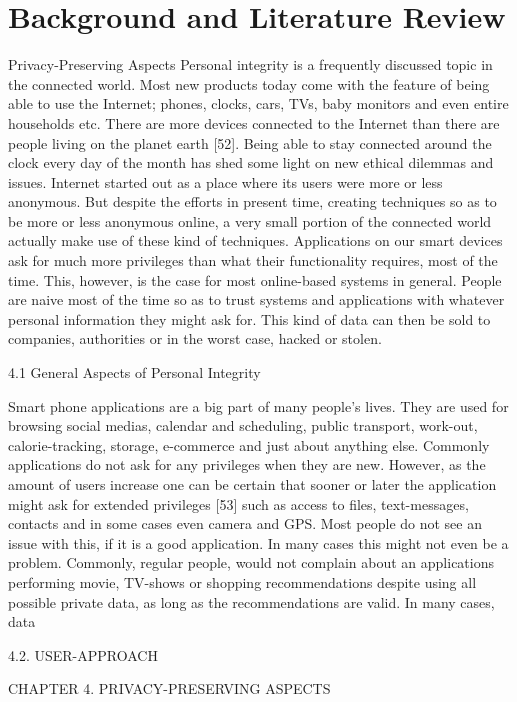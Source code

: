 \chapter{Background and Literature Review}

Privacy-Preserving Aspects
Personal integrity is a frequently discussed topic in the connected world.
Most new products today come with the feature of being able to use the Internet; phones, clocks, cars, TVs, baby monitors and even entire households etc.
There are more devices connected to the Internet than there are people living
on the planet earth [52]. Being able to stay connected around the clock every day of
the month has shed some light on new ethical dilemmas and issues. Internet started
out as a place where its users were more or less anonymous. But despite the efforts in
present time, creating techniques so as to be more or less anonymous online, a very small
portion of the connected world actually make use of these kind of techniques. Applications on our smart devices ask for much more privileges than what their functionality
requires, most of the time. This, however, is the case for most online-based systems in
general. People are naive most of the time so as to trust systems and applications with
whatever personal information they might ask for. This kind of data can then be sold
to companies, authorities or in the worst case, hacked or stolen.

4.1
General Aspects of Personal Integrity

Smart phone applications are a big part of many people’s lives. They are used for browsing social medias, calendar and scheduling, public transport, work-out, calorie-tracking,
storage, e-commerce and just about anything else. Commonly applications do not ask
for any privileges when they are new. However, as the amount of users increase one
can be certain that sooner or later the application might ask for extended privileges [53]
such as access to files, text-messages, contacts and in some cases even camera and GPS.
Most people do not see an issue with this, if it is a good application. In many cases this
might not even be a problem. Commonly, regular people, would not complain about an
applications performing movie, TV-shows or shopping recommendations despite using
all possible private data, as long as the recommendations are valid. In many cases, data


4.2. USER-APPROACH

CHAPTER 4. PRIVACY-PRESERVING ASPECTS

